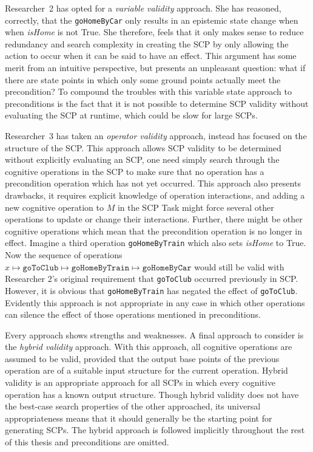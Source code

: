 Researcher~2 has opted for a \textit{variable validity} approach. She has reasoned, correctly, that the \texttt{goHomeByCar} only results in an epistemic state change when when \textit{isHome} is not True. She therefore, feels that it only makes sense to reduce redundancy and search complexity in creating the SCP by only allowing the action to occur when it can be said to have an effect. This argument has some merit from an intuitive perspective, but presents an unpleasant question: what if there are state points in which only some ground points actually meet the precondition? To compound the troubles with this variable state approach to preconditions is the fact that it is not possible to determine SCP validity without evaluating the SCP at runtime, which could be slow for large SCPs.

Researcher~3 has taken an \textit{operator validity} approach, instead has focused on the structure of the SCP. This approach allows SCP validity to be determined without explicitly evaluating an SCP, one need simply search through the cognitive operations in the SCP to make sure that no operation has a precondition operation which has not yet occurred. This approach also presents drawbacks, it requires explicit knowledge of operation interactions, and adding a new cognitive operation to $M$ in the SCP Task might force several other operations to update or change their interactions. Further, there might be other cognitive operations which mean that the precondition operation is no longer in effect. Imagine a third operation \texttt{goHomeByTrain} which also sets \textit{isHome} to True. Now the sequence of operations $x\longmapsto \texttt{goToClub} \longmapsto \texttt{goHomeByTrain} \longmapsto \texttt{goHomeByCar}$ would still be valid with Researcher 2's original requirement that  \texttt{goToClub} occurred previously in SCP. However, it is obvious that \texttt{goHomeByTrain} has negated the effect of \texttt{goToClub}. Evidently this approach is not appropriate in any case in which other operations can silence the effect of those operations mentioned in preconditions.

Every approach shows strengths and weaknesses. A final approach to consider is the \textit{hybrid validity} approach. With this approach, all cognitive operations are assumed to be valid, provided that the output base points of the previous operation are of a suitable input structure for the current operation. Hybrid validity is an appropriate approach for all SCPs in which every cognitive operation has a known output structure. Though hybrid validity does not have the best-case search properties of the other approached, its universal appropriateness means that it should generally be the starting point for generating SCPs. The hybrid approach is followed implicitly throughout the rest of this thesis and preconditions are omitted.


